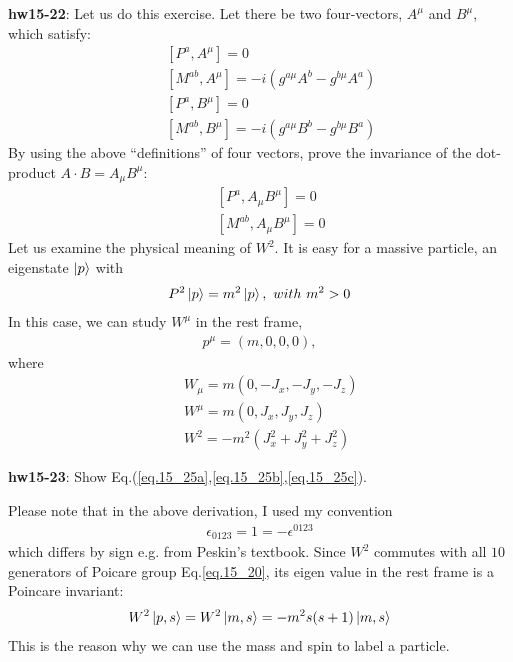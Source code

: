\documentclass[12pt]{article}
\begin{document}
{{{\bf hw15-22}: Let us do this exercise.  Let there be two four-vectors,
  $A^\mu$ and $B^\mu$, which satisfy:
\begin{eqnarray}
  && [ P^a,  A^\mu ] = 0 \label{eq.15_21a} \\
  && [ M^{ab}, A^\mu ] = -i (g^{a\mu} A^b - g^{b\mu} A^a) \label{eq.15_21b}
\end{eqnarray}
\begin{eqnarray}
  && [ P^a,  B^\mu ] = 0 \label{eq.15_22a} \\
  && [ M^{ab}, B^\mu ] = -i(g^{a\mu} B^b - g^{b\mu} B^a)  \label{eq.15_22b}
\end{eqnarray}
  By using the above ``definitions'' of four vectors, prove
  the invariance of the dot-product $A\cdot B = A_\mu B^\mu$:
\begin{eqnarray}
  && [ P^a,  A_\mu B^\mu ] = 0 \label{eq.15_23a} \\
  &&[ M^{ab}, A_\mu B^\mu ] = 0 \label{eq.15_23b} 
\end{eqnarray}
  Let us examine the physical meaning of $W^2$.
  It is easy for a massive particle, an eigenstate $\ket{p}$ with
\begin{eqnarray}
   P^2 \ket{p} = m^2 \ket{p},~with~m^2 > 0 \label{eq.15_24}
\end{eqnarray}
  In this case, we can study $W^\mu$ in the rest frame,
\begin{eqnarray}
  p^\mu = ( m, 0, 0, 0 ), \label{eq.15_25}
\end{eqnarray}
  where
\begin{eqnarray}
  && W_\mu = m ( 0, -J_x, -J_y, -J_z ) \label{eq.15_25a} \\
  && W^\mu = m ( 0,  J_x,  J_y,  J_z ) \label{eq.15_25b} \\
  && W^2   = - m^2 ( J_x^2 + J_y^2 + J_z^2 ) \label{eq.15_25c}
\end{eqnarray}

{\bf hw15-23}: Show Eq.(\ref{eq.15_25a},\ref{eq.15_25b},\ref{eq.15_25c}).

  Please note that in the above derivation, I used my convention
\begin{eqnarray}
  \epsilon_{0123} = 1 = -\epsilon^{0123} \label{eq.15_26}
\end{eqnarray}
  which differs by sign e.g. from Peskin's textbook.
  Since $W^2$ commutes with all $10$ generators of Poicare group Eq.\ref{eq.15_20}, its eigen value in the rest frame is a Poincare invariant:
\begin{eqnarray}
  W^2 \ket{p,s} = W^2 \ket{m,s} = - m^2 s(s+1) \ket{m,s} \label{eq.15_27}
\end{eqnarray}
  This is the reason why we can use the mass and spin to label a particle.

}}
\end{document}
